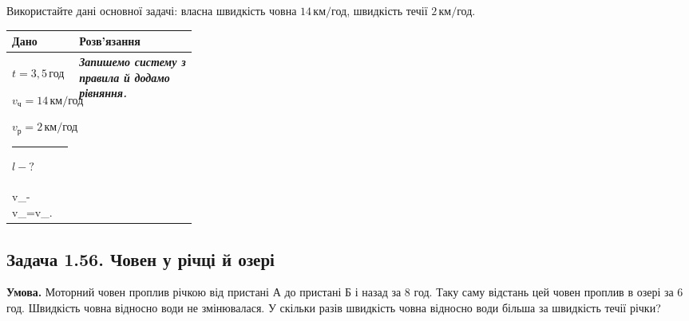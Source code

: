 \documentclass[12pt,a4paper]{article}
\newcommand{\target}[1]{\par\rule{\linewidth}{0.3pt}\par $#1-?$}
\newcommand{\why}[1]{\textbf{\textit{#1}}\par}
\newenvironment{solutiontwo}{\small\begin{tabular}{|>{\raggedright\arraybackslash}p{0.27\linewidth}|>{\raggedright\arraybackslash}p{\dimexpr0.73\linewidth-4\tabcolsep-3\arrayrulewidth\relax}|}\hline
\textbf{Дано}&\textbf{Розв'язання}\\\hline}{\\\hline\end{tabular}\par}
\begin{document}
Використайте дані основної задачі: власна швидкість човна $14\,\text{км/год}$, швидкість течії $2\,\text{км/год}$.

\begin{solutiontwo}
$t =3{,}5\,\text{год}$\par
$v_{\text{ч}}=14\,\text{км/год}$\par
$v_{\text{р}}=2\,\text{км/год}$
\target{l}

&

\setlength{\abovedisplayskip}{5pt}\setlength{\belowdisplayskip}{5pt}
\why{Запишемо систему з правила й додамо рівняння.}
\[
\begin{cases}
v_{\text{ч}}+v_{\text{р}}=v_{\text{за}},\\
v_{\text{ч}}-v_{\text{р}}=v_{\text{проти}}.
\end{cases}
\]
\[2v_{\text{ч}}=v_{\text{за}}+v_{\text{проти}}.\]
Отже, сума швидкостей відносно берега дорівнює $2\cdot14=28\,\text{км/год}$.
\why{Знайдемо кожну швидкість окремо з відповідного рівняння системи.}
\[v_{\text{за}}=14+2=16\,\text{км/год},\]
\[v_{\text{проти}}=14-2=12\,\text{км/год}.\]
\why{На обох ділянках відстань однакова, тому весь час дорівнює сумі двох відношень шляху до швидкості.}
Нехай $l$ --- відстань між пристанями. Час руху до Б та назад:
\[t_{\text{з}}=\frac{l}{v_{\text{за}}},\qquad t_{\text{п}}=\frac{l}{v_{\text{проти}}}.\]
Без зупинки в Б:
\[t =t_{\text{з}}+t_{\text{п}}=\frac{l}{v_{\text{за}}}+\frac{l}{v_{\text{проти}}}.\]
\why{Зведемо дроби до спільного знаменника й виразимо відстань.}
\[t =\frac{l(v_{\text{проти}}+v_{\text{за}})}{v_{\text{за}}v_{\text{проти}}},\]
\[l=\frac{t v_{\text{за}}v_{\text{проти}}}{v_{\text{за}}+v_{\text{проти}}}.\]
Підставляємо швидкості в км/год і час у годинах:
\[l=\frac{3{,}5\cdot16\cdot12}{16+12}=\frac{672}{28}=24\,\text{км}.\]
\textbf{Перевірка:}
\[t_{\text{з}}=\frac{24}{16}=1{,}5\,\text{год},\quad t_{\text{п}}=\frac{24}{12}=2\,\text{год},\]
\[t_{\text{з}}+t_{\text{п}}=1{,}5+2=3{,}5\,\text{год}.\]
\textbf{Відповідь:} відстань між пристанями $24\,\text{км}$.
\end{solutiontwo}
\newpage
\subsection*{Задача 1.56. Човен у річці й озері}
\textbf{Умова.} Моторний човен проплив річкою від пристані А до пристані Б і назад за 8 год. Таку саму відстань цей човен проплив в озері за 6 год. Швидкість човна відносно води не змінювалася. У скільки разів швидкість човна відносно води більша за швидкість течії річки?
\end{document}
